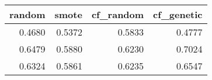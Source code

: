 \begin{tabular}{rrrr}
\toprule

 random &  smote &  cf\_random &  cf\_genetic \\
\midrule

 0.4680 & 0.5372 &     0.5833 &      0.4777 \\
 0.6479 & 0.5880 &     0.6230 &      0.7024 \\
 0.6324 & 0.5861 &     0.6235 &      0.6547 \\

\bottomrule
\end{tabular}
